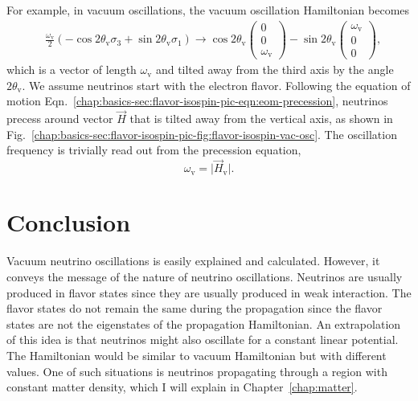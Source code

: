 For example, in vacuum oscillations, the vacuum oscillation Hamiltonian becomes
\begin{align*}
&\frac{\omega_{\mathrm v} }{2}\left( - \cos 2\theta_{\mathrm v } \sigma_3  + \sin 2\theta_{\mathrm{v}} \sigma_1 \right)
\to  \cos 2\theta_{\mathrm v}\begin{pmatrix}
0\\
0\\
\omega_{\mathrm v}
\end{pmatrix} -\sin 2\theta_{\mathrm v}\begin{pmatrix}
\omega_{\mathrm v}\\
0\\
0
\end{pmatrix},
\end{align*}
which is a vector of length $\omega_{\mathrm v}$ and tilted away from the third axis by the angle $2\theta_{\mathrm v}$. We assume neutrinos start with the electron flavor. Following the equation of motion Eqn.~\ref{chap:basics-sec:flavor-isospin-pic-eqn:eom-precession}, neutrinos precess around vector $\vec H$ that is tilted away from the vertical axis, as shown in Fig.~\ref{chap:basics-sec:flavor-isospin-pic-fig:flavor-isospin-vac-osc}. The oscillation frequency is trivially read out from the precession equation,
\begin{equation*}
    \omega_{\mathrm v} = \lvert \vec H_{\mathrm v} \rvert.
\end{equation*}





\section{Conclusion}

Vacuum neutrino oscillations is easily explained and calculated. However, it conveys the message of the nature of neutrino oscillations. Neutrinos are usually produced in flavor states since they are usually produced in weak interaction. The flavor states do not remain the same during the propagation since the flavor states are not the eigenstates of the propagation Hamiltonian. An extrapolation of this idea is that neutrinos might also oscillate for a constant linear potential. The Hamiltonian would be similar to vacuum Hamiltonian but with different values. One of such situations is neutrinos propagating through a region with constant matter density, which I will explain in Chapter~\ref{chap:matter}.
